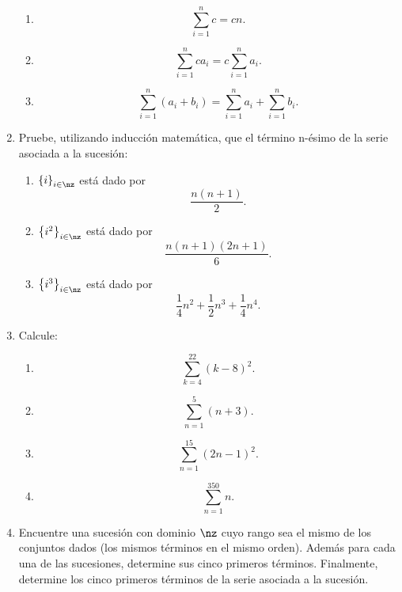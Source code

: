 \begin{enumerate}
\begin{enumerate}
\item
\[
\sum_{i=1}^{n}{c=cn.}%
\]


\item
\[
\sum_{i=1}^{n}{ca_{i}=c}\sum_{i=1}^{n}{a_{i}.}%
\]


\item
\[
\sum_{i=1}^{n}\left(  {a_{i}+b_{i}}\right)  {=}\sum_{i=1}^{n}{a_{i}+}%
\sum_{i=1}^{n}{b_{i}.}%
\]

\end{enumerate}

\item Pruebe, utilizando inducci\'{o}n matem\'{a}tica, que el t\'{e}rmino
n-\'{e}simo de la serie asociada a la sucesi\'{o}n:

\begin{enumerate}
\item $\left\{  i\right\}  _{i\in\nz}$ est\'{a} dado por
\[
\frac{n(n+1)}{2}.
\]


\item $\left\{  i^{2}\right\}  _{i\in\nz}$ est\'{a} dado por
\[
\frac{n(n+1)(2n+1)}{6}.
\]


\item $\left\{  i^{3}\right\}  _{i\in\nz}$ est\'{a} dado por
\[
\frac{1}{4}n^{2}+\frac{1}{2}n^{3}+\frac{1}{4}n^{4}.
\]

\end{enumerate}

\item Calcule:

\begin{enumerate}
\item
\[
\sum_{k=4}^{22}{(k-8)^{2}.}%
\]


\item
\[
\sum_{n=1}^{5}\left(  n+3\right)  .
\]


\item
\[
\sum_{n=1}^{15}\left(  2n-1\right)  ^{2}.
\]


\item
\[
\sum_{n=1}^{350}n.
\]

\end{enumerate}

\item Encuentre una sucesi\'{o}n con dominio $\nz$ cuyo rango sea el mismo de
los conjuntos dados (los mismos t\'{e}rminos en el mismo orden). Adem\'{a}s
para cada una de las sucesiones, determine sus cinco primeros t\'{e}rminos.
Finalmente, determine los cinco primeros t\'{e}rminos de la serie asociada a
la sucesi\'{o}n.


\end{enumerate}

